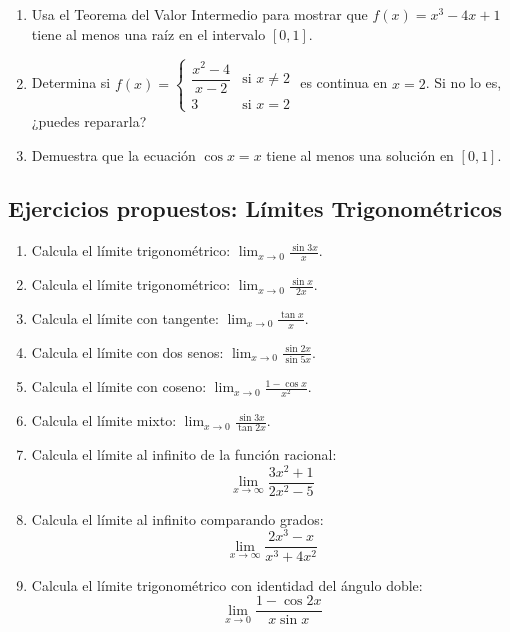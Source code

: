 \documentclass[12pt, letterpaper]{article}
\begin{document}
\begin{enumerate}[resume=ejercicios, leftmargin=*]
  \item \dificil{} Usa el Teorema del Valor Intermedio para mostrar que $f(x) = x^3 - 4x + 1$ tiene al menos una raíz en el intervalo $[0, 1]$.

  \item \dificil{} Determina si $f(x) = \begin{cases} \dfrac{x^2 - 4}{x - 2} & \text{si } x \neq 2 \\ 3 & \text{si } x = 2 \end{cases}$ es continua en $x = 2$. Si no lo es, ¿puedes repararla?

  \item \dificil{} Demuestra que la ecuación $\cos x = x$ tiene al menos una solución en $[0, 1]$.
\end{enumerate}


\subsection{Ejercicios propuestos: Límites Trigonométricos}

\begin{enumerate}[resume=ejercicios, leftmargin=*]
  \item \facil{} Calcula el límite trigonométrico: $\displaystyle\lim_{x \to 0} \frac{\sin 3x}{x}$.

  \item \facil{} Calcula el límite trigonométrico: $\displaystyle\lim_{x \to 0} \frac{\sin x}{2x}$.

  \item \medio{} Calcula el límite con tangente: $\displaystyle\lim_{x \to 0} \frac{\tan x}{x}$.

  \item \medio{} Calcula el límite con dos senos: $\displaystyle\lim_{x \to 0} \frac{\sin 2x}{\sin 5x}$.

  \item \medio{} Calcula el límite con coseno: $\displaystyle\lim_{x \to 0} \frac{1 - \cos x}{x^2}$.

  \item \dificil{} Calcula el límite mixto: $\displaystyle\lim_{x \to 0} \frac{\sin 3x}{\tan 2x}$.

  \item \dificil{} Calcula el límite al infinito de la función racional:
        $$\lim_{x \to \infty} \frac{3x^2 + 1}{2x^2 - 5}$$

  \item \dificil{} Calcula el límite al infinito comparando grados:
        $$\lim_{x \to \infty} \frac{2x^3 - x}{x^3 + 4x^2}$$

  \item \muyDificil{} Calcula el límite trigonométrico con identidad del ángulo doble:
        $$\lim_{x \to 0} \frac{1 - \cos 2x}{x \sin x}$$
\end{enumerate}
\end{document}
